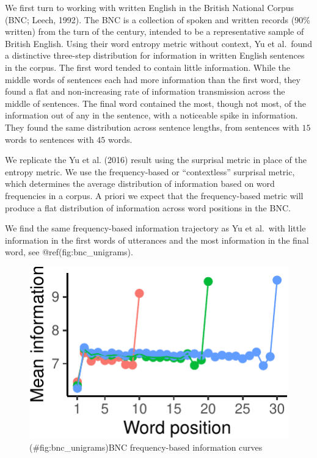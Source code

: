 \documentclass[man,floatsintext]{apa6}
\begin{document}
We first turn to working with written English in the British National Corpus (BNC; Leech, 1992). The BNC is a collection of spoken and written records (90\% written) from the turn of the century, intended to be a representative sample of British English. Using their word entropy metric without context, Yu et al.~found a distinctive three-step distribution for information in written English sentences in the corpus. The first word tended to contain little information. While the middle words of sentences each had more information than the first word, they found a flat and non-increasing rate of information transmission across the middle of sentences. The final word contained the most, though not most, of the information out of any in the sentence, with a noticeable spike in information. They found the same distribution across sentence lengths, from sentences with \(15\) words to sentences with \(45\) words.

We replicate the Yu et al. (2016) result using the surprisal metric in place of the entropy metric. We use the frequency-based or \enquote{contextless} surprisal metric, which determines the average distribution of information based on word frequencies in a corpus. A priori we expect that the frequency-based metric will produce a flat distribution of information across word positions in the BNC.

We find the same frequency-based information trajectory as Yu et al.~with little information in the first words of utterances and the most information in the final word, see @ref(fig:bnc\_unigrams).

\begin{figure}
\centering
\includegraphics{figs/bnc_unigrams-1.pdf}
\caption{(\#fig:bnc\_unigrams)BNC frequency-based information curves}
\end{figure}
\end{document}
